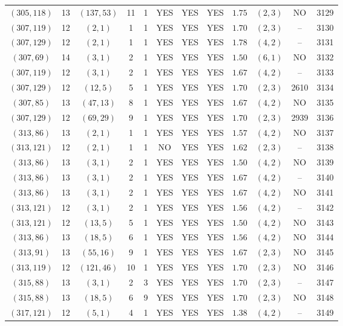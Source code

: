 \begin{longtable}{|c|c|c|c|c|c|c|c|c|c|c|c|}
$(305,118)$ & 13 & $(137,53)$ & 11 & 1 & YES & YES & YES & $1.75$ & $(2,3)$ & NO & 3129\\
$(307,119)$ & 12 & $(2,1)$ & 1 & 1 & YES & YES & YES & $1.70$ & $(2,3)$ & -- & 3130\\
$(307,129)$ & 12 & $(2,1)$ & 1 & 1 & YES & YES & YES & $1.78$ & $(4,2)$ & -- & 3131\\
$(307,69)$ & 14 & $(3,1)$ & 2 & 1 & YES & YES & YES & $1.50$ & $(6,1)$ & NO & 3132\\
$(307,119)$ & 12 & $(3,1)$ & 2 & 1 & YES & YES & YES & $1.67$ & $(4,2)$ & -- & 3133\\
$(307,129)$ & 12 & $(12,5)$ & 5 & 1 & YES & YES & YES & $1.70$ & $(2,3)$ & 2610 & 3134\\
$(307,85)$ & 13 & $(47,13)$ & 8 & 1 & YES & YES & YES & $1.67$ & $(4,2)$ & NO & 3135\\
$(307,129)$ & 12 & $(69,29)$ & 9 & 1 & YES & YES & YES & $1.70$ & $(2,3)$ & 2939 & 3136\\
$(313,86)$ & 13 & $(2,1)$ & 1 & 1 & YES & YES & YES & $1.57$ & $(4,2)$ & NO & 3137\\
$(313,121)$ & 12 & $(2,1)$ & 1 & 1 & NO & YES & YES & $1.62$ & $(2,3)$ & -- & 3138\\
$(313,86)$ & 13 & $(3,1)$ & 2 & 1 & YES & YES & YES & $1.50$ & $(4,2)$ & NO & 3139\\
$(313,86)$ & 13 & $(3,1)$ & 2 & 1 & YES & YES & YES & $1.67$ & $(4,2)$ & -- & 3140\\
$(313,86)$ & 13 & $(3,1)$ & 2 & 1 & YES & YES & YES & $1.67$ & $(4,2)$ & NO & 3141\\
$(313,121)$ & 12 & $(3,1)$ & 2 & 1 & YES & YES & YES & $1.56$ & $(4,2)$ & -- & 3142\\
$(313,121)$ & 12 & $(13,5)$ & 5 & 1 & YES & YES & YES & $1.50$ & $(4,2)$ & NO & 3143\\
$(313,86)$ & 13 & $(18,5)$ & 6 & 1 & YES & YES & YES & $1.56$ & $(4,2)$ & NO & 3144\\
$(313,91)$ & 13 & $(55,16)$ & 9 & 1 & YES & YES & YES & $1.67$ & $(2,3)$ & NO & 3145\\
$(313,119)$ & 12 & $(121,46)$ & 10 & 1 & YES & YES & YES & $1.70$ & $(2,3)$ & NO & 3146\\
$(315,88)$ & 13 & $(3,1)$ & 2 & 3 & YES & YES & YES & $1.70$ & $(2,3)$ & -- & 3147\\
$(315,88)$ & 13 & $(18,5)$ & 6 & 9 & YES & YES & YES & $1.70$ & $(2,3)$ & NO & 3148\\
$(317,121)$ & 12 & $(5,1)$ & 4 & 1 & YES & YES & YES & $1.38$ & $(4,2)$ & -- & 3149\\

\end{longtable}
